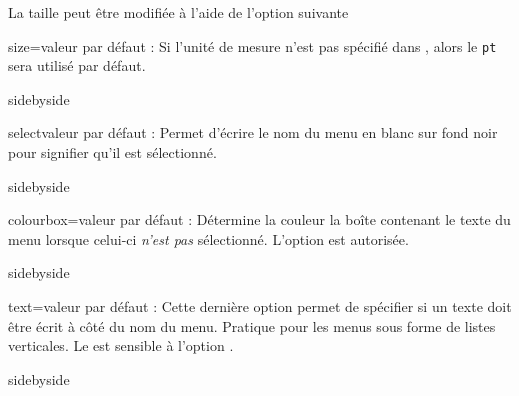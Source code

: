 \documentclass[10pt,french,a4paper]{article}
\begin{document}
La taille peut être modifiée à l'aide de l'option suivante

\begin{docKey}{size}{=}{valeur par défaut : \docValue{15pt}}
    Si l'unité de mesure n'est pas spécifié dans , alors le \texttt{pt} sera utilisé par défaut.
\end{docKey}

\begin{dispExample*}{sidebyside}
\end{dispExample*}

\begin{docKey}{select}{}{valeur par défaut : }
    Permet d'écrire le nom du menu en blanc sur fond noir pour signifier qu'il est sélectionné.
\end{docKey}

\begin{dispExample*}{sidebyside}
 
\end{dispExample*}

\begin{docKey}{colourbox}{=}{valeur par défaut : }
    Détermine la couleur la boîte contenant le texte du menu lorsque celui-ci \textit{n'est pas} sélectionné. L'option  est autorisée.
\end{docKey}

\begin{dispExample*}{sidebyside}
 
\end{dispExample*}

\begin{docKey}{text}{=}{valeur par défaut : }
    Cette dernière option permet de spécifier si un texte doit être écrit à côté du nom du menu. Pratique pour les menus sous forme de listes verticales. Le  est sensible à l'option .
\end{docKey}

\begin{dispExample*}{sidebyside}
\par
{}\par
{}
\end{dispExample*}
\end{document}

